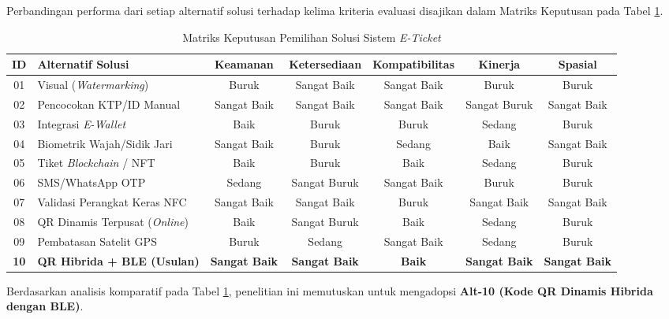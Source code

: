 Perbandingan performa dari setiap alternatif solusi terhadap kelima kriteria evaluasi disajikan dalam Matriks Keputusan pada Tabel \ref{tab:decision_matrix}.

\begin{table}[htbp]
    \caption{Matriks Keputusan Pemilihan Solusi Sistem \textit{E-Ticket}}
    \label{tab:decision_matrix}
    \centering
    \begin{tabularx}{\textwidth}{ c >{\raggedright\arraybackslash}X c c c c c }
        \toprule
        \textbf{ID} & \textbf{Alternatif Solusi} & \textbf{Keamanan} & \textbf{Ketersediaan} & \textbf{Kompatibilitas} & \textbf{Kinerja} & \textbf{Spasial} \\
        \midrule
        01 & Visual (\textit{Watermarking}) & Buruk & Sangat Baik & Sangat Baik & Buruk & Buruk \\
        02 & Pencocokan KTP/ID Manual & Sangat Baik & Sangat Baik & Sangat Baik & Sangat Buruk & Sangat Baik \\
        03 & Integrasi \textit{E-Wallet} & Baik & Buruk & Buruk & Sedang & Buruk \\
        04 & Biometrik Wajah/Sidik Jari & Sangat Baik & Buruk & Sedang & Baik & Sangat Baik \\
        05 & Tiket \textit{Blockchain} / NFT & Baik & Buruk & Baik & Sedang & Buruk \\
        06 & SMS/WhatsApp OTP & Sedang & Sangat Buruk & Sangat Baik & Buruk & Buruk \\
        07 & Validasi Perangkat Keras NFC & Sangat Baik & Sangat Baik & Buruk & Sangat Baik & Sangat Baik \\
        08 & QR Dinamis Terpusat (\textit{Online}) & Baik & Sangat Buruk & Baik & Sedang & Buruk \\
        09 & Pembatasan Satelit GPS & Buruk & Sedang & Sangat Baik & Sedang & Buruk \\
        \midrule
        \textbf{10} & \textbf{QR Hibrida + BLE (Usulan)} & \textbf{Sangat Baik} & \textbf{Sangat Baik} & \textbf{Baik} & \textbf{Sangat Baik} & \textbf{Sangat Baik} \\
        \bottomrule
    \end{tabularx}
\end{table}

Berdasarkan analisis komparatif pada Tabel \ref{tab:decision_matrix}, penelitian ini memutuskan untuk mengadopsi \textbf{Alt-10 (Kode QR Dinamis Hibrida dengan BLE)}. 

